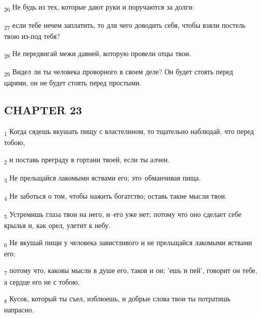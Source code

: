 \begin{tcolorbox}
\textsubscript{26} Не будь из тех, которые дают руки и поручаются за долги:
\end{tcolorbox}
\begin{tcolorbox}
\textsubscript{27} если тебе нечем заплатить, то для чего доводить себя, чтобы взяли постель твою из-под тебя?
\end{tcolorbox}
\begin{tcolorbox}
\textsubscript{28} Не передвигай межи давней, которую провели отцы твои.
\end{tcolorbox}
\begin{tcolorbox}
\textsubscript{29} Видел ли ты человека проворного в своем деле? Он будет стоять перед царями, он не будет стоять перед простыми.
\end{tcolorbox}
\subsection{CHAPTER 23}
\begin{tcolorbox}
\textsubscript{1} Когда сядешь вкушать пищу с властелином, то тщательно наблюдай, что перед тобою,
\end{tcolorbox}
\begin{tcolorbox}
\textsubscript{2} и поставь преграду в гортани твоей, если ты алчен.
\end{tcolorbox}
\begin{tcolorbox}
\textsubscript{3} Не прельщайся лакомыми яствами его; это--обманчивая пища.
\end{tcolorbox}
\begin{tcolorbox}
\textsubscript{4} Не заботься о том, чтобы нажить богатство; оставь такие мысли твои.
\end{tcolorbox}
\begin{tcolorbox}
\textsubscript{5} Устремишь глаза твои на него, и--его уже нет; потому что оно сделает себе крылья и, как орел, улетит к небу.
\end{tcolorbox}
\begin{tcolorbox}
\textsubscript{6} Не вкушай пищи у человека завистливого и не прельщайся лакомыми яствами его;
\end{tcolorbox}
\begin{tcolorbox}
\textsubscript{7} потому что, каковы мысли в душе его, таков и он; 'ешь и пей', говорит он тебе, а сердце его не с тобою.
\end{tcolorbox}
\begin{tcolorbox}
\textsubscript{8} Кусок, который ты съел, изблюешь, и добрые слова твои ты потратишь напрасно.
\end{tcolorbox}
